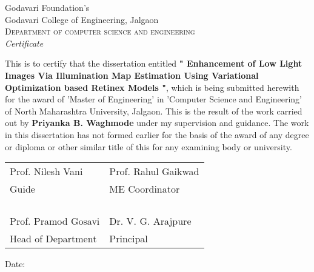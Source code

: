 \newpage
\thispagestyle{empty}

\begin{center}
\normalsize Godavari Foundation's\\
\huge{Godavari College of Engineering, Jalgaon}\\[0.5cm]
\normalsize
\textsc{Department of computer science and engineering}\\[2.0cm]

\emph{\LARGE Certificate}\\[2.5cm]
\end{center}
\normalsize This is to certify that the dissertation entitled \textbf{" Enhancement of Low Light Images Via Illumination Map Estimation Using Variational Optimization based Retinex Models "}, which is being submitted herewith for the award of 'Master of Engineering' in 'Computer Science and Engineering' of North Maharashtra University, Jalgaon. This is the result of the work carried out by \textbf{Priyanka B. Waghmode} under my supervision and guidance. The work in this dissertation has not formed earlier for the basis of the award of any degree or diploma or other similar title of this for any examining body or university.\\[1.0cm]

\begin{table}[h]
	\centering
	\begin{tabular}{m{10cm} m{4cm}}%

		Prof. Nilesh Vani & Prof. Rahul Gaikwad \\ 
		Guide & ME Coordinator \\  \\  \\  \\  \\
		Prof. Pramod Gosavi & Dr. V. G. Arajpure  \\
		Head of Department & Principal
	\end{tabular}
\end{table}

\vfill



\begin{flushleft}
Date:
\end{flushleft}
